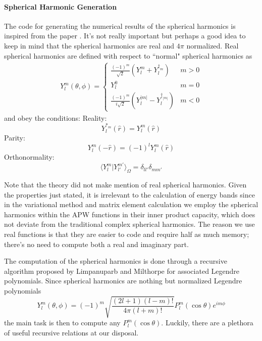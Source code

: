 \documentclass[11pt]{article}
\numberwithin{equation}{section}
\begin{document}
\paragraph{Spherical Harmonic Generation}
The code for generating the numerical results of the spherical harmonics is inspired from the paper \cite{spherHarm}. It's not really important but perhaps a good idea to keep in mind that the spherical harmonics are real and $4\pi$ normalized. Real spherical harmonics are defined with respect to ``normal" spherical harmonics as \cite{realSH}
\begin{align}
Y_l^m(\theta,\phi) = \left\{
  \begin{array}{lr}
    \frac{(-1)^m}{\sqrt{2}}(Y_l^m + Y_l^{\dagger_m}) & m > 0 \\
    Y_l^0 & m = 0 \\
    \frac{(-1)^m}{i\sqrt{2}}(Y_l^{|m|} - Y_l^{\dagger_{|m|}}) & m < 0
  \end{array}
\right.
\end{align}
and obey the conditions:
Reality:
\begin{equation}
Y_l^{*_m}(\hat{r}) = Y_l^m(\hat{r})
\end{equation}
Parity:
\begin{equation}
Y_l^m(-\hat{r}) = (-1)^lY_l^m(\hat{r})
\end{equation}
Orthonormality:
\begin{equation}
\langle Y_l^m|Y_{l'}^{m'}\rangle_{\Omega} = \delta_{ll'}\delta_{mm'}
\end{equation}

Note that the theory did not make mention of real spherical harmonics. Given the properties just stated, it is irrelevant to the calculation of energy bands since in the variational method and matrix element calculation we employ the spherical harmonics within the APW functions in their inner product capacity, which does not deviate from the traditional complex spherical harmonics. The reason we use real functions is that they are easier to code and require half as much memory; there's no need to compute both a real and imaginary part.

The computation of the spherical harmonics is done through a recursive algorithm proposed by Limpanuparb and Milthorpe for associated Legendre polynomials. Since spherical harmonics are nothing but normalized Legendre polynomials
\begin{equation}
Y_l^m(\theta,\phi) = (-1)^m\sqrt{\frac{(2l+1)(l-m)!}{4\pi(l+m)!}}P_l^m(\cos\theta)e^{im\phi}
\end{equation}
the main task is then to compute any $P_l^m(\cos\theta)$. Luckily, there are a plethora of useful recursive relations at our disposal.
\end{document}
